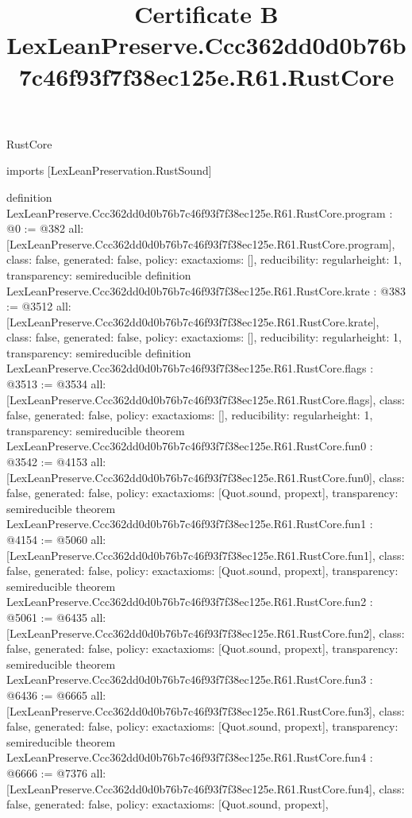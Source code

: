 \begin{lexlean}{RustCore}
\title{Certificate B LexLeanPreserve.Ccc362dd0d0b76b7c46f93f7f38ec125e.R61.RustCore}
\begin{coremodule}
imports [LexLeanPreservation.RustSound]

definition LexLeanPreserve.Ccc362dd0d0b76b7c46f93f7f38ec125e.R61.RustCore.program : @0 := @382 {
  all: [LexLeanPreserve.Ccc362dd0d0b76b7c46f93f7f38ec125e.R61.RustCore.program],
  class: false,
  generated: false,
  policy: exact{axioms: []},
  reducibility: regular{height: 1},
  transparency: semireducible
}
definition LexLeanPreserve.Ccc362dd0d0b76b7c46f93f7f38ec125e.R61.RustCore.krate : @383 := @3512 {
  all: [LexLeanPreserve.Ccc362dd0d0b76b7c46f93f7f38ec125e.R61.RustCore.krate],
  class: false,
  generated: false,
  policy: exact{axioms: []},
  reducibility: regular{height: 1},
  transparency: semireducible
}
definition LexLeanPreserve.Ccc362dd0d0b76b7c46f93f7f38ec125e.R61.RustCore.flags : @3513 := @3534 {
  all: [LexLeanPreserve.Ccc362dd0d0b76b7c46f93f7f38ec125e.R61.RustCore.flags],
  class: false,
  generated: false,
  policy: exact{axioms: []},
  reducibility: regular{height: 1},
  transparency: semireducible
}
theorem LexLeanPreserve.Ccc362dd0d0b76b7c46f93f7f38ec125e.R61.RustCore.fun0 : @3542 := @4153 {
  all: [LexLeanPreserve.Ccc362dd0d0b76b7c46f93f7f38ec125e.R61.RustCore.fun0],
  class: false,
  generated: false,
  policy: exact{axioms: [Quot.sound, propext]},
  transparency: semireducible
}
theorem LexLeanPreserve.Ccc362dd0d0b76b7c46f93f7f38ec125e.R61.RustCore.fun1 : @4154 := @5060 {
  all: [LexLeanPreserve.Ccc362dd0d0b76b7c46f93f7f38ec125e.R61.RustCore.fun1],
  class: false,
  generated: false,
  policy: exact{axioms: [Quot.sound, propext]},
  transparency: semireducible
}
theorem LexLeanPreserve.Ccc362dd0d0b76b7c46f93f7f38ec125e.R61.RustCore.fun2 : @5061 := @6435 {
  all: [LexLeanPreserve.Ccc362dd0d0b76b7c46f93f7f38ec125e.R61.RustCore.fun2],
  class: false,
  generated: false,
  policy: exact{axioms: [Quot.sound, propext]},
  transparency: semireducible
}
theorem LexLeanPreserve.Ccc362dd0d0b76b7c46f93f7f38ec125e.R61.RustCore.fun3 : @6436 := @6665 {
  all: [LexLeanPreserve.Ccc362dd0d0b76b7c46f93f7f38ec125e.R61.RustCore.fun3],
  class: false,
  generated: false,
  policy: exact{axioms: [Quot.sound, propext]},
  transparency: semireducible
}
theorem LexLeanPreserve.Ccc362dd0d0b76b7c46f93f7f38ec125e.R61.RustCore.fun4 : @6666 := @7376 {
  all: [LexLeanPreserve.Ccc362dd0d0b76b7c46f93f7f38ec125e.R61.RustCore.fun4],
  class: false,
  generated: false,
  policy: exact{axioms: [Quot.sound, propext]},
}
\end{coremodule}
\end{lexlean}
